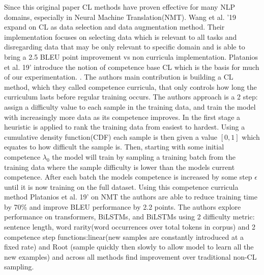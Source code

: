Since this original paper CL methods have proven effective for many NLP domains, especially in Neural Machine Translation(NMT). Wang et al. '19 \cite{Wang2019LearningAM} expand on CL as data selection and data augmentation method. Their implementation focuses on selecting data which is relevant to all tasks and disregarding data that may be only relevant to specific domain and is able to bring a 2.5 BLEU point improvement vs non curricula implementation. Platanios et al. 19' introduce the notion of competence base CL which is the basis for much of our experimentation. \cite{Platanios2019CompetencebasedCL}. The authors main contribution is building a CL method, which they called competence curricula, that only controls how long the curriculum lasts before regular training occurs. The authors approach is a 2 step: assign a difficulty value to each sample in the training data, and train the model with increasingly more data as its competence improves. In the first stage a heuristic is applied to rank the training data from easiest to hardest. Using a cumulative density function(CDF) each sample is then given a value $[0,1]$ which equates to how difficult the sample is. Then, starting with some initial competence $\lambda_0$ the model will train by sampling a training batch from the training data where the sample difficulty is lower than the models current competence. After each batch the models competence is increased by some step $\epsilon$ until it is now training on the full dataset. Using this competence curricula method Platanios et al. 19' on NMT the authors are able to reduce training time by 70\% and improve BLEU performance by 2.2 points. The authors explore performance on transformers, BiLSTMs, and BiLSTMs using 2 difficulty metric: sentence length, word rarity(word occurrences over total tokens in corpus) and 2 competence step functions:linear(new samples are constantly introduced at a fixed rate) and Root (sample quickly then slowly to allow model to learn all the new examples) and across all methods find improvement over traditional non-CL sampling.